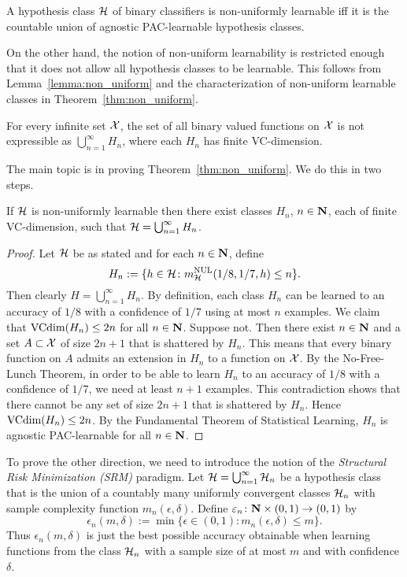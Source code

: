 \begin{theorem} \label{thm:non_uniform}
A hypothesis class $\mathcal{H}$ of binary classifiers is non-uniformly learnable iff it
is the countable union of agnostic PAC-learnable hypothesis classes.
\end{theorem}

On the other hand, the notion of non-uniform learnability is restricted enough
that it does not allow all hypothesis classes to be learnable. This follows
from Lemma~\ref{lemma:non_uniform} and the characterization of non-uniform
learnable classes in Theorem~\ref{thm:non_uniform}.

\begin{lemma}\label{lemma:non_uniform}
For every infinite set $\mathcal{X}$, the set of all binary valued functions on $\mathcal{X}$ is
not expressible as $\bigcup_{n = 1}^{\infty} H_n$, where each $H_n$ has finite VC-dimension.
\end{lemma}

The main topic is in proving Theorem~\ref{thm:non_uniform}. We do this in two steps.
\begin{lemma}\label{lemma:if_side}
If $\mathcal{H}$ is non-uniformly learnable then there exist classes $H_n$, $n \in \mathbf{N}$, each
of finite VC-dimension, such that $\mathcal{H} = \bigcup_{n = 1}^{\infty} H_n$.
\end{lemma}
\begin{proof}
Let $\mathcal{H}$ be as stated and for each $n \in \mathbf{N}$, define
\[
    H_n := \{h \in \mathcal{H} \colon m_{\mathcal{H}}^{\text{NUL}} (1/8, 1/7, h) \leq n\}.
\]
Then clearly $H = \bigcup_{n = 1}^{\infty} H_n$. By definition, each class $H_n$
can be learned to an accuracy of $1/8$ with a confidence of $1/7$ using at most $n$
examples. We claim that $\text{VCdim} (H_n) \leq 2n$ for all
$n \in \mathbf{N}$. Suppose not. Then there exist $n \in \mathbf{N}$ and a set $A \subset \mathcal{X}$ of size
$2n + 1$ that is shattered by $H_n$. This means that every binary function on $A$ admits
an extension in $H_n$ to a function on $\mathcal{X}$. By the No-Free-Lunch Theorem, in order
to be able to learn $H_n$ to an accuracy of $1/8$ with a confidence of $1/7$, we need
at least $n + 1$ examples. This contradiction shows that there cannot be any set
of size $2n + 1$ that is shattered by $H_n$. Hence $\text{VCdim} (H_n) \leq 2n$. By the
Fundamental Theorem of Statistical Learning, $H_n$ is agnostic PAC-learnable for all
$n \in \mathbf{N}$.
\qedhere
\end{proof}


To prove the other direction, we need to introduce the notion of the \emph{Structural
Risk Minimization (SRM)} paradigm. Let $\mathcal{H} = \bigcup_{n = 1}^{\infty} \mathcal{H}_n$
be a hypothesis class that is the union of a countably many uniformly convergent
classes $\mathcal{H}_n$ with sample complexity function
$m_n (\epsilon, \delta)$. Define $\varepsilon_n \colon \mathbf{N} \times (0, 1) \rightarrow (0, 1)$
by
\[
    \epsilon_n (m, \delta) :=
        \min \{\epsilon \in (0, 1) \colon m_n (\epsilon, \delta) \leq m\}.
\]
Thus $\epsilon_n (m, \delta)$ is just the best possible accuracy obtainable
when learning functions from the class $\mathcal{H}_n$ with a sample size of
at most $m$ and with confidence $\delta$.

